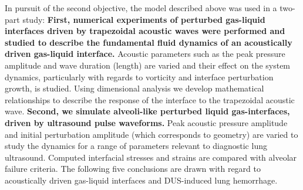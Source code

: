 In pursuit of the second objective, the model described above was used
in a two-part study: \textbf{First, numerical experiments of perturbed
  gas-liquid interfaces driven by trapezoidal acoustic waves were
  performed and studied to describe the fundamental fluid dynamics of
  an acoustically driven gas-liquid interface.} Acoustic parameters
such as the peak pressure amplitude and wave duration (length) are
varied and their effect on the system dynamics, particularly with
regards to vorticity and interface perturbation growth, is
studied. Using dimensional analysis we develop mathematical
relationships to describe the response of the interface to the
trapezoidal acoustic wave.  \textbf{Second, we simulate alveoli-like
  perturbed liquid gas-interfaces, driven by ultrasound pulse
  waveforms.} Peak acoustic pressure amplitude and initial
perturbation amplitude (which corresponds to geometry) are varied to
study the dynamics for a range of parameters relevant to diagnostic
lung ultrasound. Computed interfacial stresses and strains are
compared with alveolar failure criteria. The following five
conclusions are drawn with regard to acoustically driven gas-liquid
interfaces and \ac{DUS}-induced lung hemorrhage.
